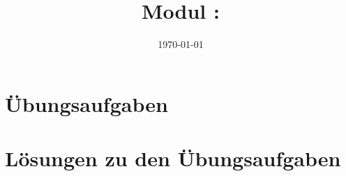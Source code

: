 \documentclass[twoside, a4paper]{article}
\title{Modul \GetItDigitalModulnumber : \GetItDigitalModulname}
\author{}
\institute{GET it digital}
\date{\today}
\begin{document}

{\setlength{\parskip}{0.05ex}    %
	\tableofcontents
	\newpage
}

\printnomenclature
\cleardoublepage

\pagestyle{fancyplain}
\setheadkapitel

\cleardoublepage




\cleardoublepage
\appendix
\setheadanhang

\section{Übungsaufgaben}
\renewcommand{\Aufgabe}[1]{#1}
\renewcommand{\Loesung}[1]{}


\section{Lösungen zu den Übungsaufgaben}
\renewcommand{\Aufgabe}[1]{}
\renewcommand{\Loesung}[1]{#1}


\clearpage
{}
\printbibliography

\clearpage
{}
\printindex
\end{document}
